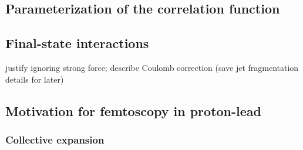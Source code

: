\subsection{Parameterization of the correlation function}
\subsection{Final-state interactions}
justify ignoring strong force; describe Coulomb correction (save jet fragmentation details for later)
\subsection{Motivation for femtoscopy in proton-lead}
\subsubsection{Collective expansion}

